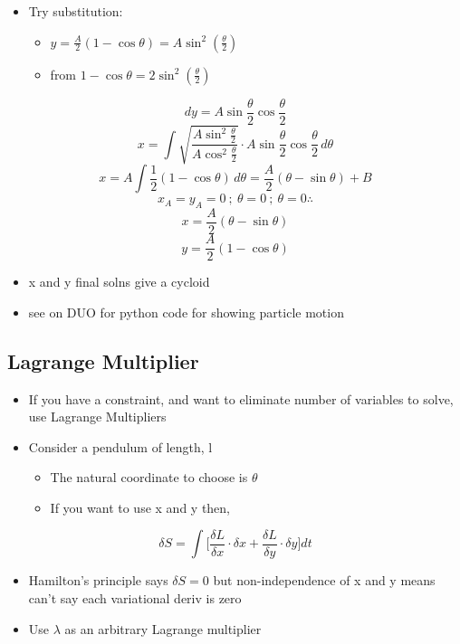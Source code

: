 \documentclass[a4paper,11pt,normalem]{article}
\begin{document}
\begin{itemize}
\item
  Try substitution:
  \begin{itemize}
  \item
    \(y = \frac{A}{2}(1 - \cos\theta) = A\sin^{2}(\frac{\theta}{2})\)
  \item
    from \(1 - \cos\theta = 2\sin^{2}(\frac{\theta}{2})\)
  \end{itemize}
\end{itemize}

\[
    dy = A\sin\frac{\theta}{2}\cos\frac{\theta}{2} \] \[
    x = \int \sqrt{\frac{A\sin^{2}\frac{\theta}{2}}{A\cos^{2}\frac{\theta}{2}}} \cdot A\sin\frac{\theta}{2}\cos\frac{\theta}{2}\,d\theta \]
\[
    x = A\int \frac{1}{2}(1 - \cos\theta)\,d\theta = \frac{A}{2}(\theta - \sin\theta) + B \]
\[
    x_A = y_A = 0 ~;~ \theta = 0 ~;~ \theta = 0 \therefore \] \[
    x = \frac{A}{2}(\theta - \sin\theta) \] \[
    y = \frac{A}{2}(1 - \cos\theta)
\]

\begin{itemize}
\item
  x and y final solns give a cycloid
\item
  see on DUO for python code for showing particle motion
\end{itemize}

\subsection{Lagrange Multiplier}\label{lagrange-multiplier}

\begin{itemize}
\item
  If you have a constraint, and want to eliminate number of variables to
  solve, use Lagrange Multipliers
\item
  Consider a pendulum of length, l
  \begin{itemize}
  \item
    The natural coordinate to choose is \(\theta\)
  \item
    If you want to use x and y then,
  \end{itemize}
\end{itemize}

\[
    \delta S = \int \Bigg[\frac{\delta L}{\delta x}\cdot \delta x + \frac{\delta L}{\delta y}\cdot \delta y \Bigg]dt
\]

\begin{itemize}
\item
  Hamilton's principle says \(\delta S = 0\) but non-independence of x
  and y means can't say each variational deriv is zero
\item
  Use \(\lambda\) as an arbitrary Lagrange multiplier
\end{itemize}
\end{document}
